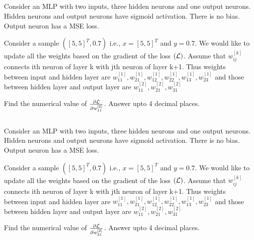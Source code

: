 \begin{frame}
\section{}
Consider an MLP with two inputs, three hidden neurons and one output neurons. Hidden neurons and output neurons have sigmoid activation. There is no bias. Output neuron has a MSE loss.

Consider a sample $([5,5]^T,0.7)$ i.e., $x = [5,5]^T$ and $y=0.7$. We would like to update all the weights based on the gradient of the loss $({\cal L})$. Assume that $w_{ij}^{[k]}$ connects ith neuron of layer k with jth neuron of layer k+1. Thus weights between input and hidden layer are $w_{11}^{[1]}, w_{21}^{[1]}, w_{12}^{[1]}, w_{22}^{[1]}, w_{13}^{[1]}, w_{23}^{[1]}$ and those between hidden layer and output layer are $w_{11}^{[2]}, w_{21}^{[2]}, w_{31}^{[2]}$

Find the numerical value of $\frac{\partial \cal L}{\partial w_{11}^{[2]}}$. Answer upto 4 decimal places.



\end{frame}


\begin{frame}
\section{}
Consider an MLP with two inputs, three hidden neurons and one output neurons. Hidden neurons and output neurons have sigmoid activation. There is no bias. Output neuron has a MSE loss.

Consider a sample $([5,5]^T,0.7)$ i.e., $x = [5,5]^T$ and $y=0.7$. We would like to update all the weights based on the gradient of the loss $({\cal L})$. Assume that $w_{ij}^{[k]}$ connects ith neuron of layer k with jth neuron of layer k+1. Thus weights between input and hidden layer are $w_{11}^{[1]}, w_{21}^{[1]}, w_{12}^{[1]}, w_{22}^{[1]}, w_{13}^{[1]}, w_{23}^{[1]}$ and those between hidden layer and output layer are $w_{11}^{[2]}, w_{21}^{[2]}, w_{31}^{[2]}$

Find the numerical value of $\frac{\partial \cal L}{\partial w_{31}^{[2]}}$. Answer upto 4 decimal places.


\end{frame}
